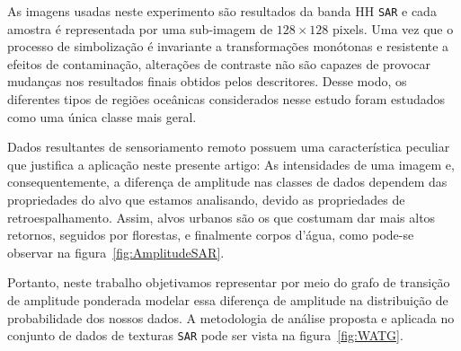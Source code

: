 \documentclass[12pt]{article}
\begin{document}
As imagens usadas neste experimento são resultados da banda HH \texttt{SAR} e cada amostra é representada por uma sub-imagem de $128 \times 128$ pixels.
Uma vez que o processo de simbolização é invariante a 
transformações monótonas e resistente a efeitos de contaminação, alterações de contraste não são capazes de provocar mudanças nos resultados finais obtidos pelos descritores. 
Desse modo, os diferentes tipos de regiões oceânicas considerados nesse estudo foram estudados como uma única classe mais geral.

Dados resultantes de sensoriamento remoto possuem uma característica peculiar que justifica a aplicação neste presente artigo: 
As intensidades de uma imagem e, consequentemente, a diferença de amplitude nas classes de dados dependem das propriedades do alvo que estamos analisando, devido as propriedades de retroespalhamento. 
Assim, alvos urbanos são os que costumam dar mais altos retornos, seguidos por florestas, e finalmente corpos d’água, como pode-se observar na figura~\ref{fig:AmplitudeSAR}.

Portanto, neste trabalho objetivamos representar por meio do grafo de transição de amplitude ponderada modelar essa diferença de amplitude na distribuição de probabilidade dos nossos dados.
A metodologia de análise proposta e aplicada no conjunto de dados de texturas \texttt{SAR} pode ser vista na figura~\ref{fig:WATG}.
\end{document}
